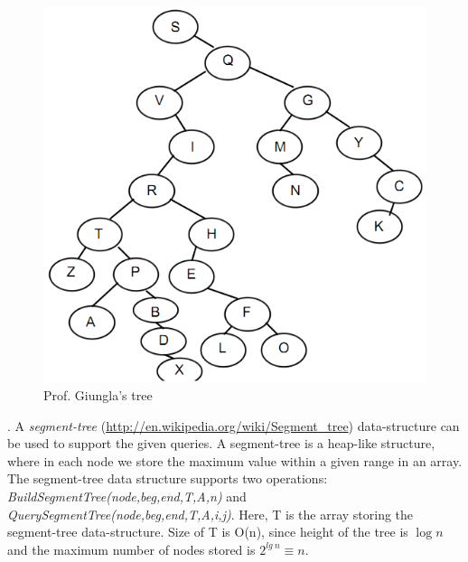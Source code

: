 \documentclass{article}
\begin{document}
 \begin{figure}[!hbt]
    \centering
    \includegraphics[width=\linewidth]{hw0_2.png}
    \caption{Prof. Giungla's tree}
 \end{figure} 

\clearpage

. A {\em segment-tree} (\url{http://en.wikipedia.org/wiki/Segment_tree}) data-structure can be used to support the given  queries.  A segment-tree is a heap-like structure, where in each node we store the maximum value within a given range in an array. The segment-tree data structure supports two operations: {\em BuildSegmentTree(node,beg,end,T,A,n)} and {\em QuerySegmentTree(node,beg,end,T,A,i,j)}. Here, T is the array storing the segment-tree data-structure. Size of T is O(n), since height of the tree is $\log{n}$ and the maximum number of nodes stored is $2^{lg \: n} \equiv n$. \\
%
%		   
\end{document}
